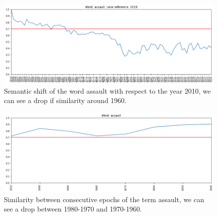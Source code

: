 \begin{figure}
\includegraphics[width=\textwidth]{images/semantic_1.png}
\caption{Semantic shift of the word assault 
with respect to the year 2010, we can see a drop if similarity around 1960.} \label{fig1}
\end{figure}
\begin{figure}
\includegraphics[width=\textwidth]{images/semantic_2.png}
\caption{Similarity between consecutive epochs of the term assault, we can see a 
drop between 1980-1970 and 1970-1960.} \label{fig2}
\end{figure}
